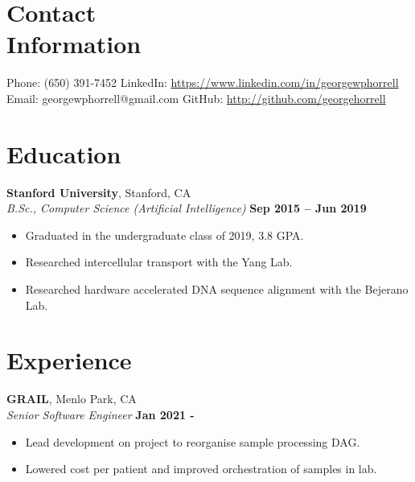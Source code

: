 \documentclass[margin,line]{resume}
\begin{document}
\begin{resume}
    \section{\mysidestyle Contact\\Information}

    Phone: (650) 391-7452       \hfill LinkedIn: \url{https://www.linkedin.com/in/georgewphorrell} \\
    \noindent Email: georgewphorrell@gmail.com  \hfill GitHub: \url{http://github.com/georgehorrell} \vspace{0mm}\\\vspace{-4.5mm}

    \section{\mysidestyle Education}

    \textbf{Stanford University}, Stanford, CA \vspace{1mm}\\\vspace{1mm}%
    \textsl{B.Sc., Computer Science (Artificial Intelligence)} \hfill \textbf{Sep 2015 -- Jun 2019}
    \begin{itemize}
        \item Graduated in the undergraduate class of 2019, 3.8 GPA. 
        \item Researched intercellular transport with the Yang Lab.
	\item Researched hardware accelerated DNA sequence alignment with the Bejerano Lab.
    \end{itemize}

    \section{\mysidestyle Experience}

    \textbf{GRAIL}, Menlo Park, CA \vspace{1mm} \\\vspace{1mm}%
    \textsl{Senior Software Engineer} \hfill \textbf{Jan 2021 - }
    \begin{itemize}
        \item Lead development on project to reorganise sample processing DAG.
	\item Lowered cost per patient and improved orchestration of samples in lab.
    \end{itemize}


\end{resume}
\end{document}
